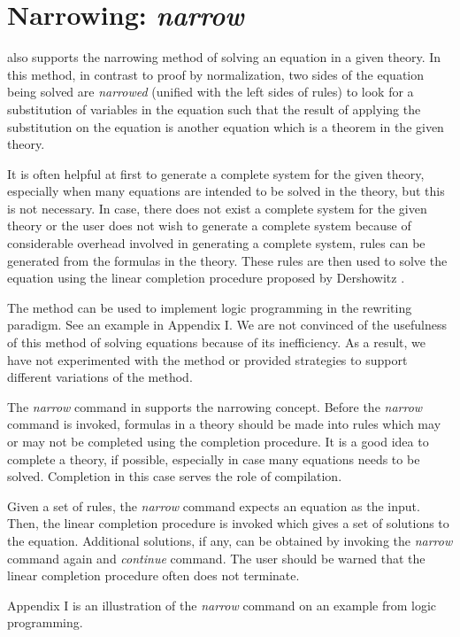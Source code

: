 \section{Narrowing: {\em narrow}}

\RRL also supports the narrowing method of solving an equation in a
given theory. In this method, in contrast to proof by normalization,
two sides of the equation being solved are {\em narrowed} (unified
with the left sides of rules) to look for a substitution of
variables in the equation such that the result of applying the
substitution on the equation is another equation which is a theorem in
the given theory.

It is often helpful at first to generate a complete system for the
given theory, especially when many equations are intended to be solved
in the theory, but this is not necessary. In case, there does not
exist a complete system for the given theory or the user does not wish
to generate a complete system because of considerable overhead
involved in generating a complete system, rules can be generated from
the formulas in the theory. These rules are then used to solve the
equation using the linear completion procedure proposed by Dershowitz
\cite{Dershowitz85}.

The method can be used to implement logic programming in the rewriting
paradigm. See an example in Appendix I.  We are not convinced of the
usefulness of this method of solving equations because of its
inefficiency. As a result, we have not experimented with the method or
provided strategies to support different variations of the method.

The {\em narrow} command in \RRL
supports the narrowing concept.  Before the {\em narrow} command is
invoked, formulas in a theory should be made into rules which may or
may not be completed using the completion procedure. It is a good idea
to complete a theory, if possible, especially in case many equations
needs to be solved.  Completion in this case serves the role of
compilation.

Given a set of rules, the {\em narrow} command expects an equation as
the input. Then, the linear completion procedure is invoked which
gives a set of solutions to the equation. Additional solutions, if
any, can be obtained by invoking the {\em narrow} command again and
{\em continue} command. The user should be warned that the linear
completion procedure often does not terminate.

Appendix I is an illustration of the {\em narrow} command on an
example from logic programming.

